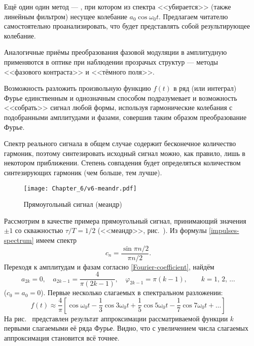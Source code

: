 Ещё один один метод --- , при котором из
спектра <<убирается>> (также линейным фильтром)
несущее колебание $a_0\cos\omega_0t$. Предлагаем читателю самостоятельно
проанализировать, что будет представлять собой результирующее колебание.

Аналогичные приёмы преобразования фазовой модуляции в амплитудную
применяются в оптике при наблюдении прозрачых структур ---
методы <<фазового контраста>> и <<тёмного поля>>.


\label{sec:synth}

Возможность разложить произвольную функцию $f(t)$ в ряд (или интеграл)
Фурье единственным и однозначным способом подразумевает и возможность
<<собрать>> сигнал любой формы, используя гармонические колебания с подобранными
амплитудами и фазами, совершив таким образом  преобразование Фурье.

Спектр реального сигнала в общем случае содержит бесконечное количество
гармоник, поэтому синтезировать исходный сигнал можно, как правило,
лишь в некотором приближении. Степень совпадения будет определяться
количеством синтезирующих гармоник (чем больше, тем лучше).

\begin{figure}[h!]
 \centering\texttt{[image: Chapter\_6/v6-meandr.pdf]}
 \caption{Прямоугольный сигнал (меандр)}
\end{figure}

Рассмотрим в качестве примера прямоугольный сигнал, принимающий
значения $\pm 1$ со скважностью $\tau/T=1/2$ (<<меандр>>,
рис.~). Из формулы \eqref{impulses-spectrum} имеем спектр
\begin{equation*}
c_n = \frac{\sin \pi n/2}{\pi n/2}.
\end{equation*}
Переходя к амплитудам и фазам согласно \eqref{Fourier-coefficient},
найдём
\begin{equation*}
a_{2k}=0,\quad a_{2k-1} = \frac{4}{\pi (2k-1)},\quad
\varphi_{2k-1} = \pi (k-1),\qquad k=1,\,2,\,\ldots
\end{equation*}
($c_0=a_0=0$). Первые несколько слагаемых в спектральном разложении:
\begin{equation*}
f(t) \approx \frac{4}{\pi} \left[ \cos \omega_0 t -
\frac{1}{3}\cos 3\omega_0 t +
\frac{1}{5}\cos 5\omega_0 t -
\frac{1}{7}\cos 7\omega_0 t + \ldots\right]
\end{equation*}
На рис.~ представлен результат аппроксимации
рассматриваемой функции $k$ первыми слагаемыми её ряда Фурье.
Видно, что с увеличением числа слагаемых аппроксимация становится всё точнее.

